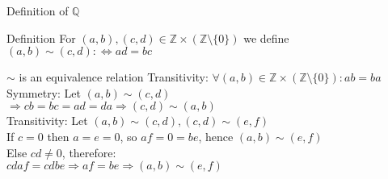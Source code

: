 \documentclass[aspectratio=169]{beamer}
\begin{document}
\begin{frame}{Definition of $\mathbb{Q}$}
    \begin{block}{Definition}
        For $(a, b), (c, d) \in \mathbb{Z} \times (\mathbb{Z} \setminus \{0\})$ we define $(a, b) \sim (c, d): \Leftrightarrow ad=bc$  
    \end{block}

    \begin{block}{$\sim$ is an equivalence relation}
        Transitivity: $\forall (a, b) \in \mathbb{Z} \times (\mathbb{Z} \setminus \{0\}): ab=ba$\\
        Symmetry: Let $(a,b) \sim (c,d)$\\
        $\Rightarrow cb=bc=ad=da \Rightarrow (c, d) \sim (a, b)$\\
        Transitivity: Let $(a, b) \sim (c, d), (c, d) \sim (e, f)$\\
        If $c = 0$ then $a=e=0$, so $af=0=be$, hence $(a, b) \sim (e, f)$\\
        Else $cd \not = 0$, therefore: \\
        $cdaf=cdbe \Rightarrow af=be \Rightarrow (a, b) \sim (e, f)$  
    \end{block}
\end{frame}
\end{document}
